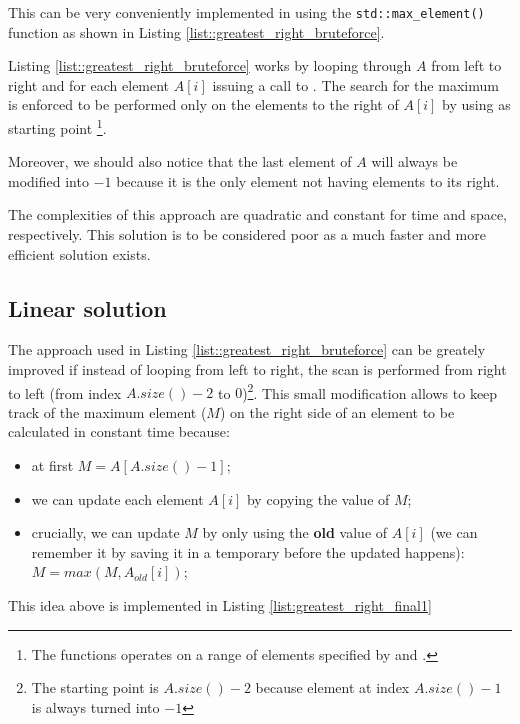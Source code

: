 This can be very conveniently implemented in \CC using the \texttt{std::max\_element()} function as shown in Listing \ref{list::greatest_right_bruteforce}. 



Listing \ref{list::greatest_right_bruteforce} works by looping through $A$ from left to right and for each element $A[i]$ issuing a call to . The search for the maximum is enforced to be performed only on the elements to the right of $A[i]$ by using as starting point \footnote{The  functions operates on a range of elements specified by  and  \cite{cit::std::maxelement}.}.

Moreover, we should also notice that the last element of $A$ will always be modified into $-1$ because it is the only element not having elements to its right.

The complexities of this approach are quadratic and constant for time and space, respectively. This solution is to be considered poor as a much faster and more efficient solution exists.

\subsection{Linear solution}
\label{sec:greatest_right:linear}
The approach used in Listing \ref{list::greatest_right_bruteforce} can be greately improved if instead of looping from left to right, the scan is performed from right to left (from index $A.size()-2$ to $0$)\footnote{The starting point is $A.size()-2$ because element at index $A.size()-1$ is always turned into $-1$}. 
This small modification allows to keep track of the maximum element ($M$) on the right side of an element  to be calculated in constant time because:
\begin{itemize}
	\item at first $M=A[A.size()-1]$;
	\item we can update each element $A[i]$ by copying the value of $M$;
	\item crucially, we can update $M$ by only using the \textbf{old} value of $A[i]$ (we can remember it by saving it in a temporary before the updated happens): $M= max(M, A_{old}[i])$;
\end{itemize}
This idea above is implemented in Listing \ref{list:greatest_right_final1}

